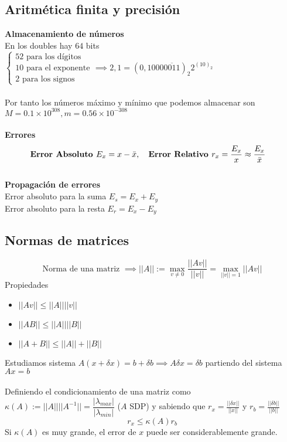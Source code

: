 \documentclass[leqno]{article}
\newcommand{\norm}[1]{\lvert \lvert #1 \rvert \rvert }
\begin{document}
\subsection{Aritmética finita y precisión}
\textbf{Almacenamiento de números} \\
En los doubles hay $64$ bits $\begin{cases}
    52\text{ para los dígitos} \\
    10\text{ para el exponente} \\
    2\text{ para los signos} 
\end{cases} \implies 2,1 = (0,1000\overline{0011})_2 2^{(10)_2}$ \\
\\
Por tanto los números máximo y mínimo que podemos almacenar son $M = 0.1\times 10^{308}, m = 0.56\times 10^{-308}$\\
\\
\textbf{Errores} \\
\[\textbf{Error Absoluto }E_x = x- \Bar{x},
\hspace{1em} \textbf{Error Relativo }r_x = \frac{E_x}{x} \approx \frac{E_x}{\Bar{x}} \hspace{1em} \]
\\
\textbf{Propagación de errores} \\
Error absoluto para la suma $E_s = E_x+E_y$ \\
Error absoluto para la resta $E_r = E_x-E_y$

\subsection{Normas de matrices}
\[\text{Norma de una matriz } \implies \norm{A} := \max_{v\neq 0}\frac{\norm{Av}}{\norm{v}}= \max_{\norm{v} = 1}\norm{Av}\]
Propiedades
\begin{itemize}
    \item $\norm{Av}\leq \norm{A}\norm{v}$
    \item $\norm{AB}\leq \norm{A}\norm{B}$
    \item $\norm{A+B}\leq \norm{A} + \norm{B}$
\end{itemize}
Estudiamos sistema $A(x+\delta x) = b + \delta b \implies A\delta x = \delta b$ partiendo del sistema $Ax=b$ \\
\\
Definiendo el condicionamiento de una matriz como $\kappa(A):=\norm{A}\norm{A^{-1}} = \dfrac{|\lambda_{max}|}{|\lambda_{min}|}$ ($A$ SDP) y sabiendo que $r_x = \frac{\norm{\delta x}}{\norm{x}}$ y $r_b = \frac{\norm{\delta b}}{\norm{b}}$
\[r_x \leq \kappa(A)r_b\]
Si $\kappa(A)$ es muy grande, el error de $x$ puede ser considerablemente grande.
\end{document}
